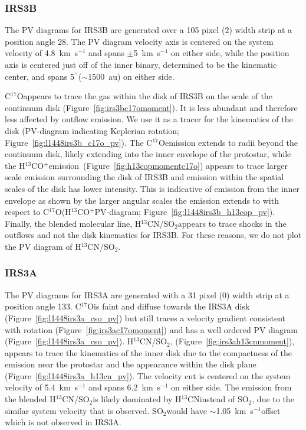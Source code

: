 \documentclass[twocolumn, 12pt,trackchanges]{aastex63}
\newcommand{\htcn}{H$^{13}$CN}
\newcommand{\cso}{C$^{17}$O}
\newcommand{\htcop}{H$^{13}$CO$^+$}
\newcommand{\sot}{SO$_{2}$}
\renewcommand{\arcsec}{$^{\prime\prime}$}
\renewcommand{\deg}{\degr}
\newcommand{\ab}{$\sim$}
\begin{document}
\subsubsection{IRS3B}
The PV diagrams for IRS3B are generated over a 105 pixel (2) width strip at a position angle 28\deg. The PV diagram velocity axis is centered on the system velocity of 4.8~km~s$^{-1}$ \citep[][]{2016Natur.538..483T} and spans $\pm$5~km~s$^{-1}$ on either side, while the position axis is centered just off of the inner binary, determined to be the kinematic center, and spans 5\arcsec\space(\ab1500~au) on either side.

\cso\space appears to trace the gas within the disk of IRS3B on the scale of the continuum disk (Figure~\ref{fig:irs3bc17omoment}). It is less abundant and therefore less affected by outflow emission. We use it as a tracer for the kinematics of the disk (PV-diagram indicating Keplerian rotation; Figure~\ref{fig:l1448irs3b_c17o_pv}). The \cso\space emission extends to radii beyond the continuum disk, likely extending into the inner envelope of the protostar, while the \htcop\space emission~(Figure~\ref{fig:h13copmomentc17o}) appears to trace larger scale emission surrounding the disk of IRS3B and emission within the spatial scales of the disk has lower intensity. This is indicative of emission from the inner envelope as shown by the larger angular scales the emission extends to with respect to \cso\space (\htcop\space PV-diagram; Figure~\ref{fig:l1448irs3b_h13cop_pv}). Finally, the blended molecular line, \htcn/\sot\space appears to trace shocks in the outflows and not the disk kinematics for IRS3B. For these reasons, we do not plot the PV diagram of \htcn/\sot.

\subsubsection{IRS3A}
The PV diagrams for IRS3A are generated with a 31 pixel (0) width strip at a position angle 133\deg. \cso\space is faint and diffuse towards the IRS3A disk (Figure~\ref{fig:l1448irs3a_cso_pv}) but still traces a velocity gradient consistent with rotation (Figure~\ref{fig:irs3ac17omoment}) and has a well ordered PV diagram (Figure~\ref{fig:l1448irs3a_cso_pv}). \htcn/\sot, (Figure~\ref{fig:irs3ah13cnmoment}), appears to trace the kinematics of the inner disk due to the compactness of the emission near the protostar and the appearance within the disk plane (Figure~\ref{fig:l1448irs3a_h13cn_pv}). The velocity cut is centered on the system velocity of 5.4~km~s$^{-1}$ and spans 6.2~km~s$^{-1}$ on either side. The emission from the blended \htcn/\sot\space is likely dominated by \htcn\space instead of \sot, due to the similar system velocity that is observed. \sot\space would have \ab1.05~km~s$^{-1}$\space offset which is not observed in IRS3A.
\end{document}
